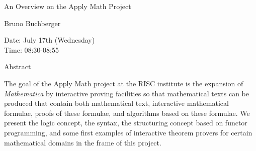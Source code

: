 \begin{center}
\LARGE
An Overview on the Apply Math Project

\end{center}

\begin{center}
\Large
Bruno Buchberger

\end{center}

\noindent
Date:  July 17th (Wednesday)\\
Time:  08:30-08:55\\

\begin{center}
\large
Abstract
\end{center}

The goal of the Apply Math project at the RISC institute is the
expansion of {\it Mathematica} by interactive proving facilities so that
mathematical texts can be produced that contain both mathematical
text, interactive mathematical formulae, proofs of these formulae, and
algorithms based on these formulae. We present the logic concept, the
syntax, the structuring concept based on functor programming, and some
first examples of interactive theorem provers for certain mathematical
domains in the frame of this project.

